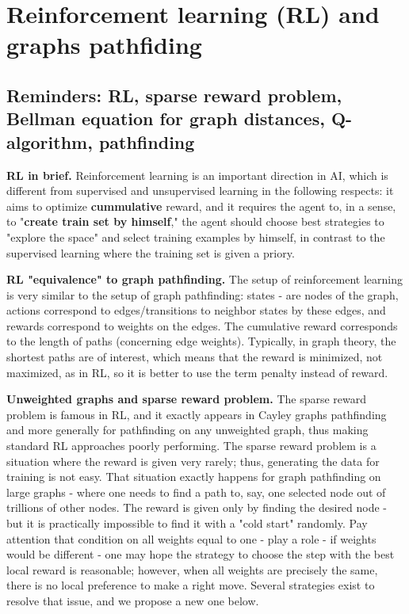 \documentclass[atmp]{ipart_v1}
\numberwithin{equation}{section}
\theoremstyle{plain}%
\begin{document}
\section{Reinforcement learning (RL) and graphs pathfiding}
\subsection{Reminders: RL, sparse reward problem, Bellman equation for graph distances,  Q-algorithm, pathfinding}

{\bf RL in brief.}
Reinforcement learning is an important direction 
in AI, which is different from supervised and unsupervised learning in the following respects: it aims to optimize {\bf cummulative} reward, and it requires the agent to, in a sense, to "{\bf create train set by himself}," the agent should choose best strategies to "explore the space" and select training examples by himself, in contrast to the supervised learning where the training set is given a priory. 

{\bf RL "equivalence" to graph pathfinding. }
The setup of reinforcement learning is very similar to the setup of graph pathfinding: states - are nodes of the graph, actions correspond to edges/transitions to neighbor states by these edges, and rewards correspond to weights on the edges. The cumulative reward corresponds to the length of paths (concerning edge weights). Typically, in graph theory, the shortest paths are of interest, which means that the reward is minimized, not maximized, as in RL, so it is better to use the term penalty instead of reward. 

{\bf Unweighted graphs and sparse reward problem.}
The sparse reward problem is famous in RL, and it exactly appears in Cayley graphs pathfinding and more generally for pathfinding on any unweighted graph, thus making standard RL approaches poorly performing.
The sparse reward problem is a situation where the reward is given very rarely; thus, generating the data for training is not easy. That situation exactly happens for graph pathfinding on large graphs - where one needs to find a path to, say, one selected node out of trillions of other nodes. The reward is given only by finding the desired node - but it is practically impossible to find it with a "cold start" randomly. Pay attention that condition on all weights equal to one - play a role - if weights would be different - one may hope the strategy to choose the step with the best local reward is reasonable; however, when all weights are precisely the same, there is no local preference to make a right move. 
Several strategies exist to resolve that issue, and we propose a new one below. 
\end{document}
